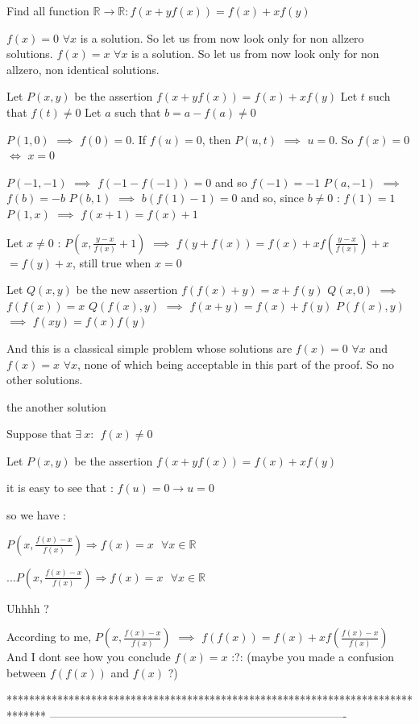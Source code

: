 \begin{solution}
	\begin{tcolorbox}Find all function $\mathbb{R} \rightarrow \mathbb{R}: f(x+yf(x)) = f(x) +x f(y)$\end{tcolorbox}
$\boxed{f(x)=0}$ $\forall x$ is a solution. So let us from now look only for non allzero solutions.
$\boxed{f(x)=x}$ $\forall x$ is a solution. So let us from now look only for non allzero, non identical solutions.

Let $P(x,y)$ be the assertion $f(x+yf(x))=f(x)+xf(y)$
Let $t$ such that $f(t)\ne 0$
Let $a$ such that $b=a-f(a)\ne 0$

$P(1,0)$ $\implies$ $f(0)=0$. If $f(u)=0$, then $P(u,t)$ $\implies$ $u=0$. So $f(x)=0$ $\iff$ $x=0$

$P(-1,-1)$ $\implies$ $f(-1-f(-1))=0$ and so $f(-1)=-1$
$P(a,-1)$ $\implies$ $f(b)=-b$
$P(b,1)$ $\implies$ $b(f(1)-1)=0$ and so, since $b\ne 0$ : $f(1)=1$
$P(1,x)$ $\implies$ $f(x+1)=f(x)+1$

Let $x\ne 0$ : $P(x,\frac{y-x}{f(x)}+1)$ $\implies$ $f(y+f(x))=f(x)+xf(\frac{y-x}{f(x)})+x$  $=f(y)+x$, still true when $x=0$

Let $Q(x,y)$ be the new assertion $f(f(x)+y)=x+f(y)$
$Q(x,0)$ $\implies$ $f(f(x))=x$
$Q(f(x),y)$ $\implies$ $f(x+y)=f(x)+f(y)$
$P(f(x),y)$ $\implies$ $f(xy)=f(x)f(y)$

And this is a classical simple problem whose solutions are $f(x)=0$ $\forall x$ and $f(x)=x$ $\forall x$, none of which being acceptable in this part of the proof.
So no other solutions.
\end{solution}



\begin{solution}
	the another solution

Suppose that $\exists\:   x :\:  \: f(x)\neq 0$

Let $P(x,y)$ be the assertion $f(x+yf(x))=f(x)+xf(y)$

it is easy to see that : $f(u)=0\rightarrow u=0$  

so we have :

$P(x , \frac{f(x)-x}{f(x)})\Rightarrow f(x)=x \: \: \: \forall x\in \mathbb{R}$
\end{solution}



\begin{solution}
	\begin{tcolorbox}...$P(x , \frac{f(x)-x}{f(x)})\Rightarrow f(x)=x \: \: \: \forall x\in \mathbb{R}$\end{tcolorbox}
Uhhhh ?

According to me, $P(x , \frac{f(x)-x}{f(x)})$ $\implies$ $f(f(x))=f(x)+xf(\frac{f(x)-x}{f(x)})$ 
And I dont see how you conclude $f(x)=x$ :?: (maybe you made a confusion between $f(f(x))$ and $f(x)$ ?)
\end{solution}
*******************************************************************************
-------------------------------------------------------------------------------

